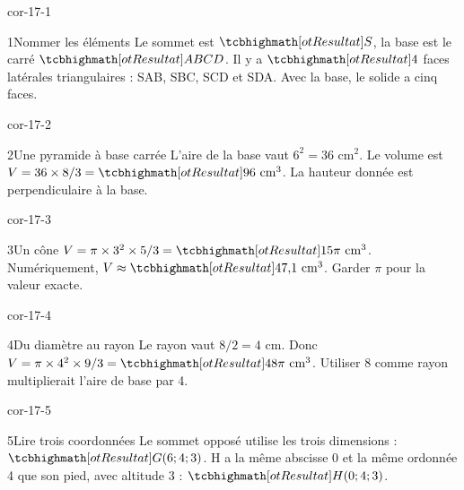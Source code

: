 \clearpage\pagestyle{otMain}\setlength{\otBlocEspacement}{2.5mm}\fontsize{11}{15}\selectfont{}
\begin{blocLivre}{cor-17-1}\begin{corrige}{1}{Nommer les éléments}
Le sommet est $\res S$, la base est le carré $\res{ABCD}$. Il y a $\res4$ faces latérales triangulaires : SAB, SBC, SCD et SDA. Avec la base, le solide a cinq faces.
\label{fig-cor-17-1}
\end{corrige}\end{blocLivre}
\begin{blocLivre}{cor-17-2}\begin{corrige}{2}{Une pyramide à base carrée}
L’aire de la base vaut $6^2=36$ cm$^2$. Le volume est $V=36\times8/3=\res{96\ \mathrm{cm}^3}$. La hauteur donnée est perpendiculaire à la base.
\label{fig-cor-17-2}
\end{corrige}\end{blocLivre}
\begin{blocLivre}{cor-17-3}\begin{corrige}{3}{Un cône}
$V=\pi\times3^2\times5/3=\res{15\pi\ \mathrm{cm}^3}$. Numériquement, $V\approx\res{47{,}1\ \mathrm{cm}^3}$. Garder $\pi$ pour la valeur exacte.
\label{fig-cor-17-3}
\end{corrige}\end{blocLivre}
\begin{blocLivre}{cor-17-4}\begin{corrige}{4}{Du diamètre au rayon}
Le rayon vaut $8/2=4$ cm. Donc $V=\pi\times4^2\times9/3=\res{48\pi\ \mathrm{cm}^3}$. Utiliser 8 comme rayon multiplierait l’aire de base par 4.
\label{fig-cor-17-4}
\end{corrige}\end{blocLivre}
\begin{blocLivre}{cor-17-5}\begin{corrige}{5}{Lire trois coordonnées}
Le sommet opposé utilise les trois dimensions : $\res{G(6;4;3)}$. H a la même abscisse 0 et la même ordonnée 4 que son pied, avec altitude 3 : $\res{H(0;4;3)}$.
\label{fig-cor-17-5}
\end{corrige}\end{blocLivre}
